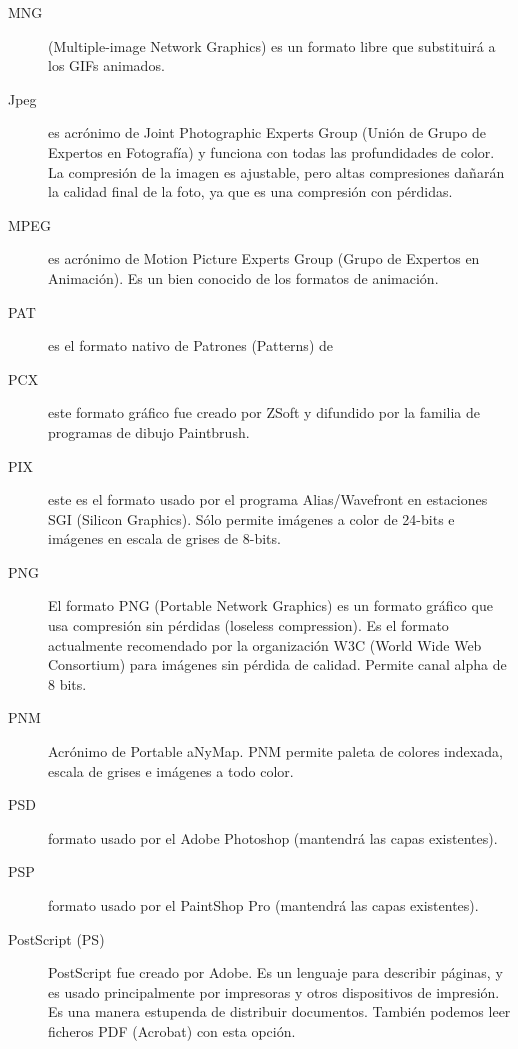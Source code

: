 \begin{description}
\item [MNG] (Multiple-image Network Graphics)  es un formato libre que
substituirá a los GIFs animados.

\item [Jpeg]  es acrónimo de  Joint Photographic Experts  Group (Unión
de  Grupo  de  Expertos  en  Fotografía)  y  funciona  con  todas  las
profundidades de color. La compresión  de la imagen es ajustable, pero
altas compresiones dañarán la calidad final  de la foto, ya que es una
compresión con pérdidas.

\item [MPEG]  es acrónimo  de Motion Picture  Experts Group  (Grupo de
Expertos  en  Animación). Es  un  bien  conocido  de los  formatos  de
animación.

\item [PAT] es el formato nativo de Patrones (Patterns) de \gimp

\item [PCX] este formato gráfico fue creado por ZSoft y difundido por 
la familia de programas de dibujo Paintbrush.                         

\item [PIX] este  es el formato usado por  el programa Alias/Wavefront
en estaciones SGI (Silicon Graphics). Sólo permite imágenes a color de
24-bits e imágenes en escala de grises de 8-bits.

\item [PNG] El  formato PNG (Portable Network Graphics)  es un formato
gráfico que usa compresión sin  pérdidas (loseless compression). Es el
formato actualmente  recomendado por  la organización W3C  (World Wide
Web Consortium)  para imágenes sin  pérdida de calidad.  Permite canal
alpha de 8 bits.

\item [PNM] Acrónimo de Portable aNyMap. PNM permite paleta de colores
indexada, escala de grises e imágenes a todo color.

\item [PSD] formato usado por  el Adobe Photoshop (\gimp mantendrá las
capas existentes).

\item [PSP]  formato usado por  el PaintShop Pro (\gimp  mantendrá las
capas existentes).

\item  [PostScript  (PS)]  PostScript  fue creado  por  Adobe.  Es  un
lenguaje  para  describir  páginas,  y  es  usado  principalmente  por
impresoras y otros dispositivos de  impresión. Es una manera estupenda
de distribuir documentos. También  podemos leer ficheros PDF (Acrobat)
con esta opción.


\end{description}
